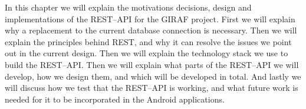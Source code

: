 In this chapter we will explain the motivations decisions, design and implementations of the REST--API for the GIRAF project.
First we will explain why a replacement to the current database connection is necessary.
Then we will explain the principles behind REST, and why it can resolve the issues we point out in the current design.
Then we will explain the technology stack we use to build the REST--API.
Then we will explain what parts of the REST--API we will develop, how we design them, and which will be developed in total.
And lastly we will discuss how we test that the REST--API is working, and what future work is needed for it to be incorporated in the Android applications.
